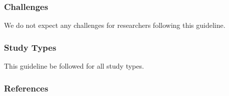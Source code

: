 \subsubsection{Challenges}

We do not expect any challenges for researchers following this guideline.


\subsubsection{Study Types}

This guideline \must be followed for all study types.


\subsubsection{References}





